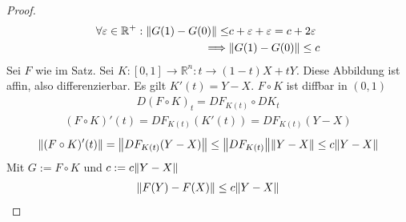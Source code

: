 \documentclass{report}
\renewcommand\epsilon{\varepsilon}
\newcommand{\bR}{\mathbb{R}}
\begin{document}
\begin{theorem}
\begin{proof}
\begin{align*}
  \forall \epsilon \in \bR^+ : \norm{G(1) - G(0)} \leq &c + \epsilon + \epsilon = c + 2 \epsilon\\
  \implies &\norm{G(1) - G(0)} \leq c
 \end{align*}
 Sei $F$ wie im Satz. Sei $K : [0,1] \to \bR^n : t \to (1-t)X + tY$. Diese Abbildung ist affin, also differenzierbar. Es gilt $K'(t) = Y - X$. $F \circ K$ ist diffbar in $(0,1)$
 \begin{align*}
  D(F \circ K)_t = DF_{K(t)} \circ DK_t
 \end{align*}
 \begin{align*}
  (F \circ K)'(t) = DF_{K(t)}(K'(t)) = DF_{K(t)}(Y-X)
 \end{align*}
 \begin{align*}
  \norm{(F \circ K)'(t)} = \norm{DF_{K(t)}(Y - X)} \leq \norm{DF_{K(t)}}\norm{Y - X} \leq c \norm{Y - X}
 \end{align*}
 Mit $G := F \circ K$ und $c := c\norm{Y - X}$
 \begin{align*}
  \norm{F(Y) - F(X)} \leq c\norm{Y - X}
 \end{align*}

 \end{proof}
\end{theorem}

%
%
%
%
%
%
%
%
%
%
%
\end{document}
